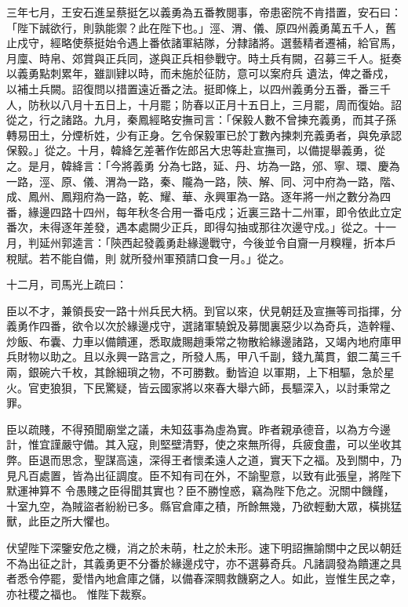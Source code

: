 \begin{pinyinscope}
 三年七月，王安石進呈蔡挺乞以義勇為五番教閱事，帝患密院不肯措置，安石曰：「陛下誠欲行，則孰能禦？此在陛下也。」涇、渭、儀、原四州義勇萬五千人，舊止戍守，經略使蔡挺始令遇上番依諸軍結隊，分隸諸將。選藝精者遷補，給官馬，月廩、時帛、郊賞與正兵同，遂與正兵相參戰守。時土兵有闕，召募三千人。挺奏以義勇點刺累年，雖訓肄以時，而未施於征防，意可以案府兵
 遺法，俾之番戍，以補土兵闕。詔復問以措置遠近番之法。挺即條上，以四州義勇分五番，番三千人，防秋以八月十五日上，十月罷；防春以正月十五日上，三月罷，周而復始。詔從之，行之諸路。九月，秦鳳經略安撫司言：「保毅人數不曾揀充義勇，而其子孫轉易田土，分煙析姓，少有正身。乞令保毅軍已於丁數內揀刺充義勇者，與免承認保毅。」從之。十月，韓絳乞差著作佐郎呂大忠等赴宣撫司，以備提舉義勇，從之。是月，韓絳言：「今將義勇
 分為七路，延、丹、坊為一路，邠、寧、環、慶為一路，涇、原、儀、渭為一路，秦、隴為一路，陝、解、同、河中府為一路，階、成、鳳州、鳳翔府為一路，乾、耀、華、永興軍為一路。逐年將一州之數分為四番，緣邊四路十四州，每年秋冬合用一番屯戍；近裏三路十二州軍，即令依此立定番次，未得逐年差發，遇本處闕少正兵，即得勾抽或那往次邊守戍。」從之。十一月，判延州郭逵言：「陝西起發義勇赴緣邊戰守，今後並令自齎一月糗糧，折本戶稅賦。若不能自備，則
 就所發州軍預請口食一月。」從之。



 十二月，司馬光上疏曰：



 臣以不才，兼領長安一路十州兵民大柄。到官以來，伏見朝廷及宣撫等司指揮，分義勇作四番，欲令以次於緣邊戍守，選諸軍驍銳及募閭裏惡少以為奇兵，造幹糧、炒飯、布囊、力車以備饋運，悉取歲賜趙秉常之物散給緣邊諸路，又竭內地府庫甲兵財物以助之。且以永興一路言之，所發人馬，甲八千副，錢九萬貫，銀二萬三千兩，銀碗六千枚，其餘細瑣之物，不可勝數。動皆迫
 以軍期，上下相驅，急於星火。官吏狼狽，下民驚疑，皆云國家將以來春大舉六師，長驅深入，以討秉常之罪。



 臣以疏賤，不得預聞廟堂之議，未知茲事為虛為實。昨者親承德音，以為方今邊計，惟宜謹嚴守備。其入寇，則堅壁清野，使之來無所得，兵疲食盡，可以坐收其弊。臣退而思念，聖謀高遠，深得王者懷柔遠人之道，實天下之福。及到關中，乃見凡百處置，皆為出征調度。臣不知有司在外，不諭聖意，以致有此張皇，將陛下默運神算不
 令愚賤之臣得聞其實也？臣不勝惶惑，竊為陛下危之。況關中饑饉，十室九空，為賊盜者紛紛已多。縣官倉庫之積，所餘無幾，乃欲輕動大眾，橫挑猛獸，此臣之所大懼也。



 伏望陛下深鑒安危之機，消之於未萌，杜之於未形。速下明詔撫諭關中之民以朝廷不為出征之計，其義勇更不分番於緣邊戍守，亦不選募奇兵。凡諸調發為饋運之具者悉令停罷，愛惜內地倉庫之儲，以備春深賙救饑窮之人。如此，豈惟生民之幸，亦社稷之福也。
 惟陛下裁察。




\end{pinyinscope}
